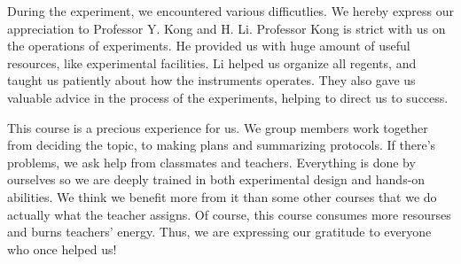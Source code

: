 
During the experiment, we encountered various difficutlies. We hereby express our appreciation to Professor Y. Kong and H. Li. Professor Kong is strict with us on the operations of experiments. He provided us with huge amount of useful resources, like experimental facilities. Li helped us organize all regents, and taught us patiently about how the instruments operates. They also gave us valuable advice in the process of the experiments, helping to direct us to success. 

This course is a precious experience for us. We group members work together from deciding the topic, to making plans and summarizing protocols. If there's problems, we ask help from classmates and teachers. Everything is done by ourselves so we are deeply trained in both experimental design and hands-on abilities. We think we benefit more from it than some other courses that we do actually what the teacher assigns. Of course, this course consumes more resourses and burns teachers' energy. Thus, we are expressing our gratitude to everyone who once helped us!










%
%
%
%
%
%
%

